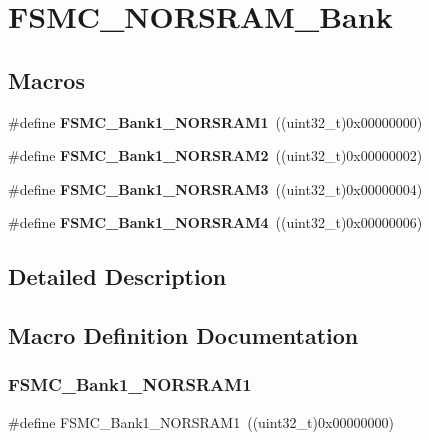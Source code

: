 \section{F\+S\+M\+C\+\_\+\+N\+O\+R\+S\+R\+A\+M\+\_\+\+Bank}
\label{group__FSMC__NORSRAM__Bank}
\subsection*{Macros}
\begin{DoxyCompactItemize}
\item 
\#define \textbf{ F\+S\+M\+C\+\_\+\+Bank1\+\_\+\+N\+O\+R\+S\+R\+A\+M1}~((uint32\+\_\+t)0x00000000)
\item 
\#define \textbf{ F\+S\+M\+C\+\_\+\+Bank1\+\_\+\+N\+O\+R\+S\+R\+A\+M2}~((uint32\+\_\+t)0x00000002)
\item 
\#define \textbf{ F\+S\+M\+C\+\_\+\+Bank1\+\_\+\+N\+O\+R\+S\+R\+A\+M3}~((uint32\+\_\+t)0x00000004)
\item 
\#define \textbf{ F\+S\+M\+C\+\_\+\+Bank1\+\_\+\+N\+O\+R\+S\+R\+A\+M4}~((uint32\+\_\+t)0x00000006)
\end{DoxyCompactItemize}


\subsection{Detailed Description}


\subsection{Macro Definition Documentation}
\mbox{\label{group__FSMC__NORSRAM__Bank_ga514a05828041fa1a13d464c9e4a0a4a9}} 
\subsubsection{F\+S\+M\+C\+\_\+\+Bank1\+\_\+\+N\+O\+R\+S\+R\+A\+M1}
{\footnotesize\ttfamily \#define F\+S\+M\+C\+\_\+\+Bank1\+\_\+\+N\+O\+R\+S\+R\+A\+M1~((uint32\+\_\+t)0x00000000)}



